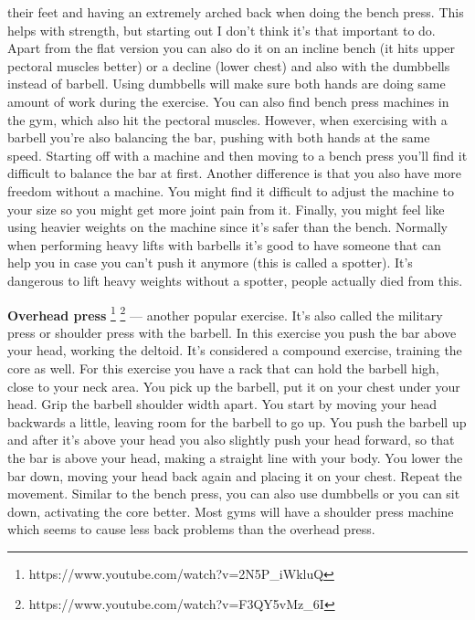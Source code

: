 \documentclass[openany, 12pt]{book}
\begin{document}
        their feet and having an extremely arched back when doing the bench press. This helps with strength, but starting out I don't think it's that important to do.
        Apart from the flat version you can also do it on an incline bench (it hits upper pectoral muscles better) or a decline (lower chest) and also with the dumbbells instead of barbell.
        Using dumbbells will make sure both hands are doing same amount of work during the exercise. You can also find bench press machines in the gym, which also hit the pectoral muscles.
        However, when exercising with a barbell you're also balancing the bar, pushing with both hands at the same speed.
        Starting off with a machine and then
        moving to a bench press you'll find it difficult to balance the bar at first. Another difference is that you also have more freedom without a machine. You might find it difficult
        to adjust the machine to your size so you might get more joint pain from it. Finally, you might feel like using heavier weights on the machine since it's safer than the bench.
        Normally when performing heavy lifts with barbells it's good to have someone that can help you in case you can't push it anymore (this is called a spotter). It's dangerous to lift
        heavy weights without a spotter, people actually died from this.

        \textbf{Overhead press}
        \footnote{https://www.youtube.com/watch?v=2N5P\_iWkluQ}
        \footnote{https://www.youtube.com/watch?v=F3QY5vMz\_6I}
        --- another popular exercise. It's also called the military press or shoulder press with the barbell. In this exercise you push the bar above your head, working the
        deltoid. It's considered a compound exercise, training the core as well. For this exercise you have a rack that can hold the barbell high, close to your neck area. You pick up
        the barbell, put it on your chest under your head. Grip the barbell shoulder width apart. You start by moving your head backwards a little, leaving room for the barbell to go up.
        You push the barbell up and after it's above your head you also slightly push your head forward, so that the bar is above your head, making a straight line with your body. You lower
        the bar down, moving your head back again and placing it on your chest. Repeat the movement. Similar to the bench press, you can also use dumbbells or you can sit down, activating the
        core better. Most gyms will have a shoulder press machine which seems to cause less back problems than the overhead press.
\end{document}
